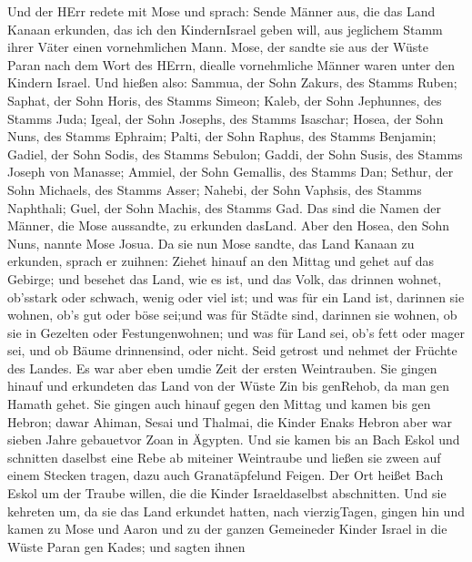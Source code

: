  Und der HErr redete mit Mose und sprach:  Sende
Männer aus, die das Land Kanaan erkunden, das ich den KindernIsrael
geben will, aus jeglichem Stamm ihrer Väter einen vornehmlichen Mann.
 Mose, der sandte sie aus der Wüste Paran nach dem Wort des
HErrn, diealle vornehmliche Männer waren unter den Kindern Israel.
 Und hießen also: Sammua, der Sohn Zakurs, des Stamms Ruben;
 Saphat, der Sohn Horis, des Stamms Simeon; 
Kaleb, der Sohn Jephunnes, des Stamms Juda;  Igeal, der Sohn
Josephs, des Stamms Isaschar;  Hosea, der Sohn Nuns, des
Stamms Ephraim;  Palti, der Sohn Raphus, des Stamms
Benjamin;  Gadiel, der Sohn Sodis, des Stamms Sebulon;
 Gaddi, der Sohn Susis, des Stamms Joseph von Manasse;
 Ammiel, der Sohn Gemallis, des Stamms Dan; 
Sethur, der Sohn Michaels, des Stamms Asser;  Nahebi, der
Sohn Vaphsis, des Stamms Naphthali;  Guel, der Sohn Machis,
des Stamms Gad.  Das sind die Namen der Männer, die Mose
aussandte, zu erkunden dasLand. Aber den Hosea, den Sohn Nuns, nannte
Mose Josua.  Da sie nun Mose sandte, das Land Kanaan zu
erkunden, sprach er zuihnen: Ziehet hinauf an den Mittag und gehet auf
das Gebirge;  und besehet das Land, wie es ist, und das
Volk, das drinnen wohnet, ob'sstark oder schwach, wenig oder viel ist;
 und was für ein Land ist, darinnen sie wohnen, ob's gut
oder böse sei;und was für Städte sind, darinnen sie wohnen, ob sie in
Gezelten oder Festungenwohnen;  und was für Land sei, ob's
fett oder mager sei, und ob Bäume drinnensind, oder nicht. Seid getrost
und nehmet der Früchte des Landes. Es war aber eben umdie Zeit der
ersten Weintrauben.  Sie gingen hinauf und erkundeten das
Land von der Wüste Zin bis genRehob, da man gen Hamath gehet.
 Sie gingen auch hinauf gegen den Mittag und kamen bis gen
Hebron; dawar Ahiman, Sesai und Thalmai, die Kinder Enaks Hebron aber
war sieben Jahre gebauetvor Zoan in Ägypten.  Und sie kamen
bis an Bach Eskol und schnitten daselbst eine Rebe ab miteiner
Weintraube und ließen sie zween auf einem Stecken tragen, dazu auch
Granatäpfelund Feigen.  Der Ort heißet Bach Eskol um der
Traube willen, die die Kinder Israeldaselbst abschnitten. 
Und sie kehreten um, da sie das Land erkundet hatten, nach vierzigTagen,
 gingen hin und kamen zu Mose und Aaron und zu der ganzen
Gemeineder Kinder Israel in die Wüste Paran gen Kades; und sagten ihnen
